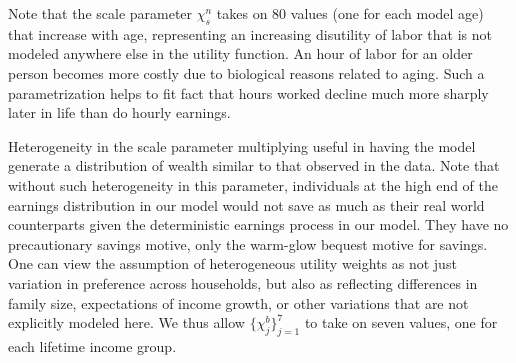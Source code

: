 \documentclass[letterpaper,12pt]{article}
\theoremstyle{definition}
\begin{document}
\begin{spacing}{1.5}
   Note that the scale parameter $\chi^n_s$ takes on 80 values (one for each model age) that increase with age, representing an increasing disutility of labor that is not modeled anywhere else in the utility function. An hour of labor for an older person becomes more costly due to biological reasons related to aging. Such a parametrization helps to fit fact that hours worked decline much more sharply later in life than do hourly earnings. 
   
   Heterogeneity in the scale parameter multiplying useful in having the model generate a distribution of wealth similar to that observed in the data.  Note that without such heterogeneity in this parameter, individuals at the high end of the earnings distribution in our model would not save as much as their real world counterparts given the deterministic earnings process in our model. They have no precautionary savings motive, only the warm-glow bequest motive for savings.  One can view the assumption of heterogeneous utility weights as not just variation in preference across households, but also as reflecting differences in family size, expectations of income growth, or other variations that are not explicitly modeled here.  We thus allow  $\{\chi^b_j\}_{j=1}^7$ to take on seven values, one for each lifetime income group.


%
%
%


\end{spacing}
\end{document}

